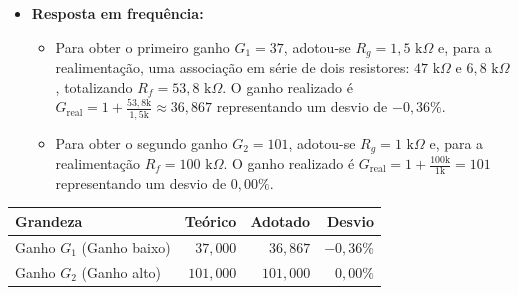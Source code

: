 \documentclass[11pt,a4paper]{article}
\begin{document}
\begin{itemize}

    \item \textbf{Resposta em frequência:} 
    \begin{itemize}
    
        \item Para obter o primeiro ganho $G_1=37$, adotou-se $R_g=1{,}5\text{ k}\Omega$ e, para a realimentação, uma associação em série de dois resistores: $47\text{ k}\Omega$ e $6{,}8\text{ k}\Omega$, totalizando $R_f=53{,}8\text{ k}\Omega$. O ganho realizado é $G_{\text{real}}=1+\frac{53{,}8\text{k}}{1{,}5\text{k}} \approx 36{,}867$ representando um desvio de $-0{,}36\%$.
        
        \item Para obter o segundo ganho $G_2=101$, adotou-se $R_g=1\text{ k}\Omega$ e, para a realimentação $R_f=100\text{ k}\Omega$. O ganho realizado é $G_{\text{real}}=1+\frac{100\text{k}}{1\text{k}} =101$ representando um desvio de $0{,}00\%$.
        
    \end{itemize}
\end{itemize}

\begin{center}
\renewcommand{\arraystretch}{1.2}
\begin{tabular}{@{}lrrr@{}}
\toprule
\textbf{Grandeza} & \textbf{Teórico} & \textbf{Adotado} & \textbf{Desvio} \\
\midrule
Ganho $G_1$ (Ganho baixo) & $37{,}000$ & $36{,}867$ & $-0{,}36\%$ \\
Ganho $G_2$ (Ganho alto) & $101{,}000$ & $101{,}000$ & $0{,}00\%$ \\
\bottomrule
\end{tabular}
\end{center}
\end{document}
